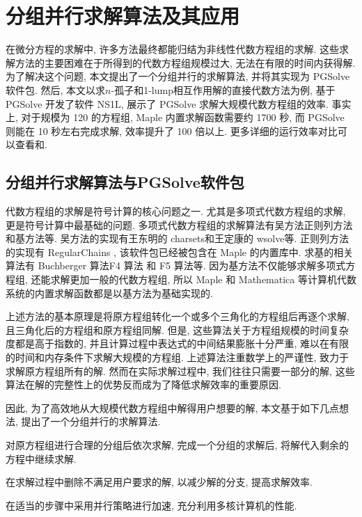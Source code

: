 \chapter{分组并行求解算法及其应用}\label{ch03}
在微分方程的求解中, 许多方法最终都能归结为非线性代数方程组的求解. 这些求解方法的主要困难在于所得到的代数方程组规模过大, 无法在有限的时间内获得解. 为了解决这个问题, 本文提出了一个分组并行的求解算法, 并将其实现为 PGSolve 软件包. 然后, 本文以求$n$-孤子和1-lump相互作用解的直接代数方法为例, 基于 PGSolve 开发了软件 NS1L, 展示了 PGSolve 求解大规模代数方程组的效率. 事实上, 对于规模为 120 的方程组, Maple 内置求解函数需要约 1700 秒, 而 PGSolve 则能在 10 秒左右完成求解, 效率提升了 100 倍以上. 更多详细的运行效率对比可以查看和. 

\section{分组并行求解算法与PGSolve软件包}
代数方程组的求解是符号计算的核心问题之一. 尤其是多项式代数方程组的求解, 更是符号计算中最基础的问题. 多项式代数方程组的求解算法有吴方法\cite{wu1984,wu1985}\D 正则列方法\cite{kalkbrener1991three,lu1994searching}和\Grobner{}基方法\cite{adams1994introduction}等. 吴方法的实现有王东明的 charsets\cite{wang1995implementation}和王定康的 wsolve\cite{wsolve}等. 正则列方法的实现有 RegularChains \cite{maza2000triangular}, 该软件包已经被包含在 Maple 的内置库中. 求\Grobner{}基的相关算法有 Buchberger 算法\cite{buchberger1970algorithmic}\D F4 算法\cite{faugere1999new} 和 F5 算法\cite{faugere2002new}等. 因为\Grobner{}基方法不仅能够求解多项式方程组, 还能求解更加一般的代数方程组, 所以 Maple 和 Mathematica 等计算机代数系统的内置求解函数都是以\Grobner{}基方法为基础实现的.

上述方法的基本原理是将原方程组转化一个或多个三角化的方程组后再逐个求解, 且三角化后的方程组和原方程组同解. 但是, 这些算法关于方程组规模的时间复杂度都是高于指数的, 并且计算过程中表达式的中间结果膨胀十分严重, 难以在有限的时间和内存条件下求解大规模的方程组. 上述算法注重数学上的严谨性, 致力于求解原方程组所有的解. 然而在实际求解过程中, 我们往往只需要一部分的解, 这些算法在解的完整性上的优势反而成为了降低求解效率的重要原因. 

因此, 为了高效地从大规模代数方程组中解得用户想要的解, 本文基于如下几点想法, 提出了一个分组并行的求解算法.
\begin{compactenum}[(1)]
\item 对原方程组进行合理的分组后依次求解, 完成一个分组的求解后, 将解代入剩余的方程中继续求解. 
\item 在求解过程中删除不满足用户要求的解, 以减少解的分支, 提高求解效率.
\item 在适当的步骤中采用并行策略进行加速, 充分利用多核计算机的性能.
\end{compactenum}

